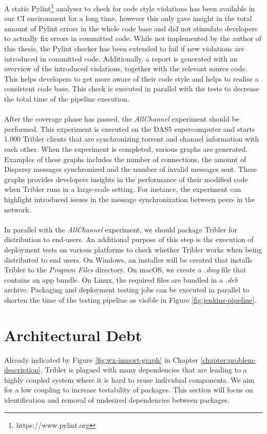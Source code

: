 \noindent A static Pylint\footnote{https://www.pylint.org} analyser to check for code style violations has been available in our CI environment for a long time, however this only gave insight in the total amount of Pylint errors in the whole code base and did not stimulate developers to actually fix errors in committed code. While not implemented by the author of this thesis, the Pylint checker has been extended to fail if new violations are introduced in committed code. Additionally, a report is generated with an overview of the introduced violations, together with the relevant source code. This helps developers to get more aware of their code style and helps to realise a consistent code base. This check is executed in parallel with the tests to decrease the total time of the pipeline execution.\\\\
After the coverage phase has passed, the \emph{AllChannel} experiment should be performed. This experiment is executed on the DAS5 supercomputer and starts 1.000 Tribler clients that are synchronizing torrent and channel information with each other. When the experiment is completed, various graphs are generated. Examples of these graphs includes the number of connections, the amount of Dispersy messages synchronized and the number of invalid messages sent. These graphs provides developers insights in the performance of their modified code when Tribler runs in a large-scale setting. For instance, the experiment can highlight introduced issues in the message synchronization between peers in the network.\\\\
In parallel with the \emph{AllChannel} experiment, we should package Tribler for distribution to end-users. An additional purpose of this step is the execution of deployment tests on various platforms to check whether Tribler works when being distributed to end users. On Windows, an installer will be created that installs Tribler to the \emph{Program Files} directory. On macOS, we create a \emph{.dmg} file that contains an app bundle. On Linux, the required files are bundled in a \emph{.deb} archive. Packaging and deployment testing jobs can be executed in parallel to shorten the time of the testing pipeline as visible in Figure \ref{fig:jenkins-pipeline}.

\section{Architectural Debt}
Already indicated by Figure \ref{fig:wx-import-graph} in Chapter \ref{chapter:problem-description}, Tribler is plagued with many dependencies that are leading to a highly coupled system where it is hard to reuse individual components. We aim for a low coupling to increase testability of packages. This section will focus on identification and removal of undesired dependencies between packages.

